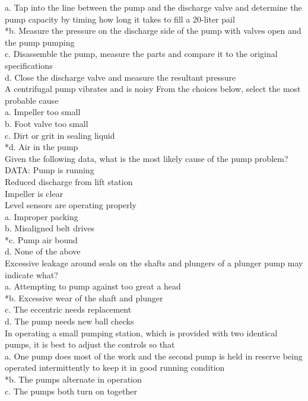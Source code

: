 a. Tap into the line between the pump and the discharge valve and determine the pump capacity by timing how long it takes to fill a 20-liter pail \\
*b. Measure the pressure on the discharge side of the pump with valves open and the pump pumping \\
c. Disassemble the pump, measure the parts and compare it to the original specifications \\
d. Close the discharge valve and measure the resultant pressure \\
 A centrifugal pump vibrates and is noisy From the choices below, select the most probable cause \\
a. Impeller too small \\
b. Foot valve too small \\
c. Dirt or grit in sealing liquid \\
*d. Air in the pump \\
 Given the following data, what is the most likely cause of the pump problem?\\
DATA: Pump is running\\
Reduced discharge from lift station\\
Impeller is clear\\
Level sensors are operating properly \\
a. Improper packing \\
b. Misaligned belt drives \\
*c. Pump air bound \\
d. None of the above \\
 Excessive leakage around seals on the shafts and plungers of a plunger pump may indicate what? \\
a. Attempting to pump against too great a head \\
*b. Excessive wear of the shaft and plunger \\
c. The eccentric needs replacement \\
d. The pump needs new ball checks \\
 In operating a small pumping station, which is provided with two identical pumps, it is best to adjust the controls so that \\
a. One pump does most of the work and the second pump is held in reserve being operated intermittently to keep it in good running condition \\
*b. The pumps alternate in operation \\
c. The pumps both turn on together \\
